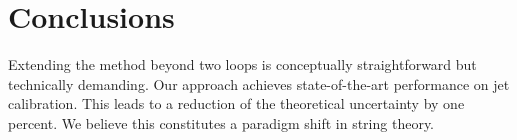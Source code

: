 \section{Conclusions}\label{sec:conclusions}

Extending the method beyond two loops is conceptually straightforward
but technically demanding. Our approach achieves state-of-the-art
performance on jet calibration. This leads to a reduction of the
theoretical uncertainty by one percent. We believe this constitutes a
paradigm shift in string theory.

